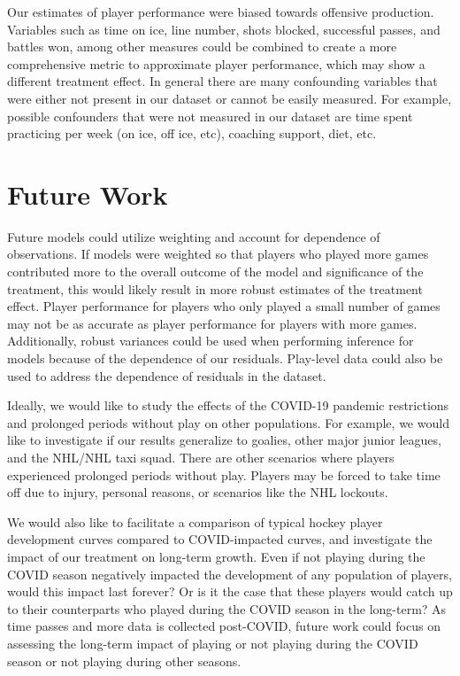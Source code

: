 \documentclass[12pt]{article}
\begin{document}
Our estimates of player performance were biased towards offensive
production. Variables such as time on ice, line number, shots blocked,
successful passes, and battles won, among other measures could be
combined to create a more comprehensive metric to approximate player
performance, which may show a different treatment effect. In general
there are many confounding variables that were either not present in our
dataset or cannot be easily measured. For example, possible confounders
that were not measured in our dataset are time spent practicing per week
(on ice, off ice, etc), coaching support, diet, etc.

\hypertarget{future-work}{%
\section{Future Work}\label{future-work}}

Future models could utilize weighting and account for dependence of
observations. If models were weighted so that players who played more
games contributed more to the overall outcome of the model and
significance of the treatment, this would likely result in more robust
estimates of the treatment effect. Player performance for players who
only played a small number of games may not be as accurate as player
performance for players with more games. Additionally, robust variances
could be used when performing inference for models because of the
dependence of our residuals. Play-level data could also be used to
address the dependence of residuals in the dataset.

Ideally, we would like to study the effects of the COVID-19 pandemic
restrictions and prolonged periods without play on other populations.
For example, we would like to investigate if our results generalize to
goalies, other major junior leagues, and the NHL/NHL taxi squad. There
are other scenarios where players experienced prolonged periods without
play. Players may be forced to take time off due to injury, personal
reasons, or scenarios like the NHL lockouts.

We would also like to facilitate a comparison of typical hockey player
development curves compared to COVID-impacted curves, and investigate
the impact of our treatment on long-term growth. Even if not playing
during the COVID season negatively impacted the development of any
population of players, would this impact last forever? Or is it the case
that these players would catch up to their counterparts who played
during the COVID season in the long-term? As time passes and more data
is collected post-COVID, future work could focus on assessing the
long-term impact of playing or not playing during the COVID season or
not playing during other seasons.
\end{document}
